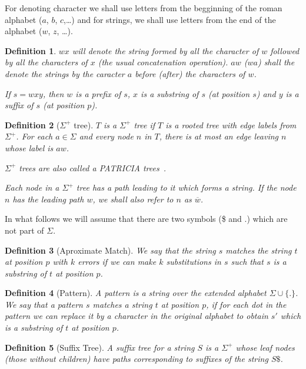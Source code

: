 \documentclass[a4paper,10pt]{article}
\newtheorem{definition}{Definition}
\begin{document}
For denoting character we shall use letters from the begginning of the roman alphabet ($a$, $b$, $c$,\ldots) and for strings, we shall use letters from the end of the alphabet ($w$, $z$, \ldots).

\begin{definition}
$wx$ will denote the string formed by all the character of $w$ followed by all the characters of $x$ (the usual concatenation operation). $aw$ ($wa$) shall the denote the strings by the caracter $a$ before (after) the characters of $w$.

If $s = wxy$, then $w$ is a \emph{prefix} of $s$, $x$ is a \emph{substring} of $s$ (at position $s$) and $y$ is a \emph{suffix} of $s$ (at position $p$).
\end{definition}

\begin{definition}[$\Sigma^+$ tree]
$T$ is a $\Sigma^+$ tree if $T$ is a rooted tree with edge labels from $\Sigma^+$. For each $a \in \Sigma$ and every node $n$ in $T$, there is at most an edge leaving $n$ whose label is $aw$.

$\Sigma^+$ trees are also called a PATRICIA trees~\cite{pat}.

Each node in a $\Sigma^+$ tree has a path leading to it which forms a string. If the node $n$ has the leading path $w$, we shall also refer to $n$ as $\overline{w}$.
\end{definition}

In what follows we will assume that there are two symbols (\$ and $.$) which are not part of $\Sigma$.

\begin{definition}[Aproximate Match]
We say that the string $s$ matches the string $t$ at position $p$ with $k$ errors if we can make $k$ substitutions in $s$ such that $s$ is a substring of $t$ at position $p$.
\end{definition}

\begin{definition}[Pattern]
A pattern is a string over the extended alphabet $\Sigma\cup\{.\}$. We say that a pattern $s$ matches a string $t$ at position $p$, if for each dot in the pattern we can replace it by a character in the original alphabet to obtain $s'$ which is a substring of $t$ at position $p$.
\end{definition}

\begin{definition}[Suffix Tree]
A \emph{suffix tree} for a string $S$ is a $\Sigma^+$ whose leaf nodes (those without children) have paths corresponding to suffixes of the string $S\$ $.
\end{definition}
\end{document}
